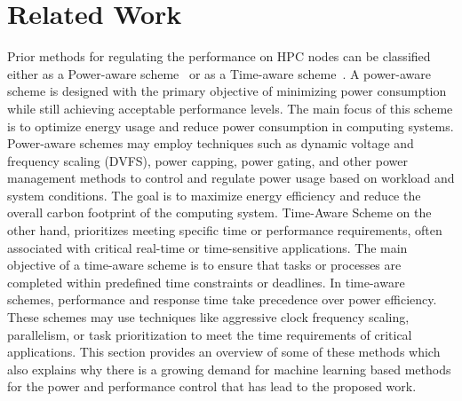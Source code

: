 \section{Related Work}\label{sec:Related_work}

{Prior methods for regulating the performance on HPC nodes can be classified either as a Power-aware scheme~\cite{hsu2005power,patki2015practical} or as a Time-aware scheme~\cite{sadrosadati2019itap,qiu2012three}. A power-aware scheme is designed with the primary objective of minimizing power consumption while still achieving acceptable performance levels. The main focus of this scheme is to optimize energy usage and reduce power consumption in computing systems. Power-aware schemes may employ techniques such as dynamic voltage and frequency scaling (DVFS), power capping, power gating, and other power management methods to control and regulate power usage based on workload and system conditions. The goal is to maximize energy efficiency and reduce the overall carbon footprint of the computing system. Time-Aware Scheme on the other hand, prioritizes meeting specific time or performance requirements, often associated with critical real-time or time-sensitive applications. The main objective of a time-aware scheme is to ensure that tasks or processes are completed within predefined time constraints or deadlines. In time-aware schemes, performance and response time take precedence over power efficiency. These schemes may use techniques like aggressive clock frequency scaling, parallelism, or task prioritization to meet the time requirements of critical applications.} This section provides an overview of some of these methods which also explains why there is a growing demand for machine learning based methods for the power and performance control that has lead to the proposed work. 

